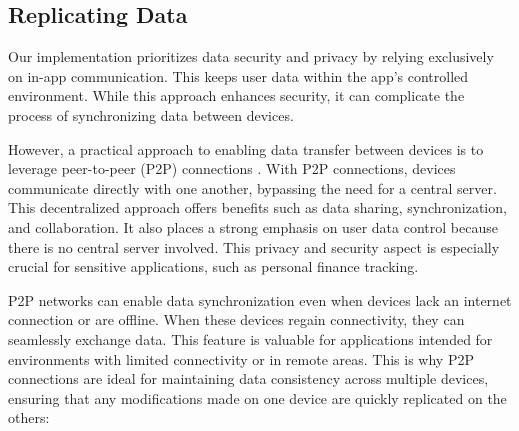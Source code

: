 
\subsection{Replicating Data}

Our implementation prioritizes data security and privacy by relying exclusively on in-app communication. This keeps user 
data within the app's controlled environment. While this approach enhances security, it can complicate the process of 
synchronizing data between devices. 

However, a practical approach to enabling data transfer between devices is to leverage peer-to-peer (P2P) connections 
. With P2P connections, devices communicate directly with one another, bypassing the need for a central 
server. This decentralized approach offers benefits such as data sharing, synchronization, and collaboration. It also 
places a strong emphasis on user data control because there is no central server involved. This privacy and security 
aspect is especially crucial for sensitive applications, such as personal finance tracking.

P2P networks can enable data synchronization even when devices lack an internet connection or are offline. When these 
devices regain connectivity, they can seamlessly exchange data. This feature is valuable for applications intended for 
environments with limited connectivity or in remote areas. This is why P2P connections are ideal for maintaining data 
consistency across multiple devices, ensuring that any modifications made on one device are quickly replicated on the 
others:


